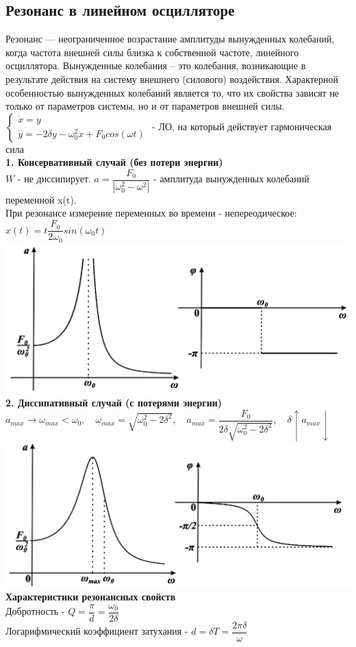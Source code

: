 \begin{multicols*}{2}
		\section{Резонанс в линейном осцилляторе}
		Резонанс — неограниченное возрастание амплитуды вынужденных колебаний, когда частота внешней силы близка к собственной частоте, линейного осциллятора. Вынужденные колебания – это колебания, возникающие в результате действия на систему  внешнего (силового) воздействия. Характерной особенностью вынужденных  колебаний является то, что их свойства зависят не только от параметров системы, но и от параметров внешней силы.\\
		$\begin{cases}
			\dot{x} = y \\
			\dot{y} = -2\delta y-\omega_0^2 x + F_0 cos(\omega t)
		\end{cases} $ - ЛО, на который действует гармоническая сила\\
		\textbf{1. Консервативный случай (без потери энергии)}\\
		$W$ - не диссипирует. $a = \dfrac{F_0}{\left\lvert \omega_0^2 - \omega^2\right\rvert }$ - амплитуда вынужденных колебаний переменной x(t).\\
		При резонансе измерение переменных во времени - непереодическое: $x(t) = t\dfrac{F_0}{2\omega_0}sin(\omega_0 t)$\\
		\includegraphics[width=0.6\linewidth]{tk_img/rezonans_1.png}\\
		\textbf{2. Диссипативный случай (с потерями энергии)}\\
		$a_{max}\to \omega_{max}<\omega_0, \quad \omega_{max} = \sqrt{\omega_0^2 - 2\delta^2}, \quad a_{max} = \dfrac{F_0}{2\delta \sqrt{\omega_0^2 - 2\delta^2}}, \quad \delta \uparrow a_{max} \downarrow $\\
		\includegraphics[width=0.6\linewidth]{tk_img/rezonans_2.png}\\
		\textbf{Характеристики резонансных свойств}\\
		Добротность - $Q = \dfrac{\pi}{d} = \dfrac{\omega_0}{2\delta}$\\
		Логарифмический коэффициент затухания - $d = \delta T = \dfrac{2\pi \delta }{\omega}$
		

\end{multicols*}
